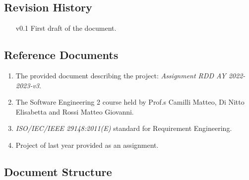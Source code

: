\documentclass[11pt]{article}
\begin{document}
\newpage

\subsection{Revision History}

\begin{enumerate}
    \item[v0.1] First draft of the document.
\end{enumerate}

\subsection{Reference Documents}

\begin{enumerate}
    \item The provided document describing the project: \textit{Assignment RDD AY 2022-2023-v3}.
    \item The Software Engineering 2 course held by Prof.s Camilli Matteo, Di Nitto Elisabetta and Rossi Matteo Giovanni.
    \item \textit{ISO/IEC/IEEE 29148:2011(E)} standard for Requirement Engineering.
    \item Project of last year provided as an assignment.
\end{enumerate}

\subsection{Document Structure}
\end{document}
